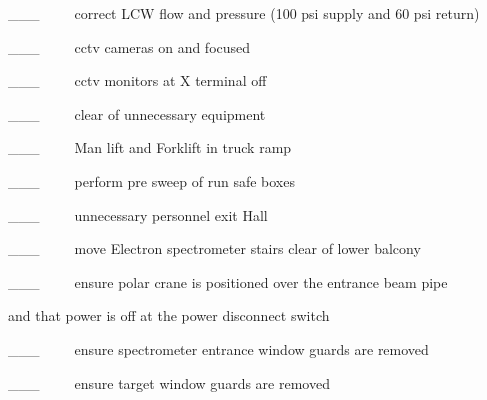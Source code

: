 \_\_\_~~~~~correct LCW flow and pressure (100 psi supply and 60 psi return)

\_\_\_~~~~~cctv cameras on and focused

\_\_\_~~~~~cctv monitors at X terminal off

\_\_\_~~~~~clear of unnecessary equipment

\_\_\_~~~~~Man lift and Forklift in truck ramp

\_\_\_~~~~~perform pre sweep of run safe boxes

\_\_\_~~~~~unnecessary personnel exit Hall

\_\_\_~~~~~move Electron spectrometer stairs clear of lower balcony

\_\_\_~~~~~ensure polar crane is positioned over the entrance beam pipe 

and that power is off at the power disconnect switch 

\_\_\_~~~~~ensure spectrometer entrance window guards are removed

\_\_\_~~~~~ensure target window guards are removed
%
